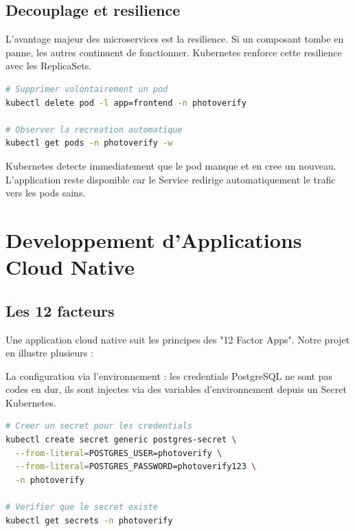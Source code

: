 \documentclass[12pt,a4paper]{article}
\begin{document}
\subsection{Decouplage et resilience}

L'avantage majeur des microservices est la resilience. Si un composant tombe en panne, les autres continuent de fonctionner. Kubernetes renforce cette resilience avec les ReplicaSets.

\begin{lstlisting}[language=bash, caption={Test de resilience}]
# Supprimer volontairement un pod
kubectl delete pod -l app=frontend -n photoverify

# Observer la recreation automatique
kubectl get pods -n photoverify -w
\end{lstlisting}

Kubernetes detecte immediatement que le pod manque et en cree un nouveau. L'application reste disponible car le Service redirige automatiquement le trafic vers les pods sains.

\section{Developpement d'Applications Cloud Native}

\subsection{Les 12 facteurs}

Une application cloud native suit les principes des "12 Factor Apps". Notre projet en illustre plusieurs :

La configuration via l'environnement : les credentials PostgreSQL ne sont pas codes en dur, ils sont injectes via des variables d'environnement depuis un Secret Kubernetes.

\begin{lstlisting}[language=bash, caption={Injection de configuration via Secrets}]
# Creer un secret pour les credentials
kubectl create secret generic postgres-secret \
  --from-literal=POSTGRES_USER=photoverify \
  --from-literal=POSTGRES_PASSWORD=photoverify123 \
  -n photoverify

# Verifier que le secret existe
kubectl get secrets -n photoverify
\end{lstlisting}
\end{document}
